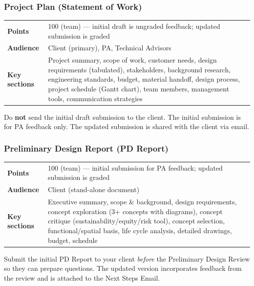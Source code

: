 \subsubsection{Project Plan (Statement of Work)}
\label{sssec:project-plan}

\begin{tabularx}{\textwidth}{lX}
\toprule
\textbf{Points} & 100 (team) --- initial draft is ungraded feedback; updated submission is graded \\
\textbf{Audience} & Client (primary), PA, Technical Advisors \\
\textbf{Key sections} & Project summary, scope of work, customer needs, design requirements (tabulated), stakeholders, background research, engineering standards, budget, material handoff, design process, project schedule (Gantt chart), team members, management tools, communication strategies \\
\bottomrule
\end{tabularx}

\begin{warnbox}
Do \textbf{not} send the initial draft submission to the client. The initial submission is for PA feedback only. The updated submission is shared with the client via email.
\end{warnbox}

\subsubsection{Preliminary Design Report (PD Report)}
\label{sssec:pdr-report}

\begin{tabularx}{\textwidth}{lX}
\toprule
\textbf{Points} & 100 (team) --- initial submission for PA feedback; updated submission is graded \\
\textbf{Audience} & Client (stand-alone document) \\
\textbf{Key sections} & Executive summary, scope \& background, design requirements, concept exploration (3+ concepts with diagrams), concept critique (sustainability/equity/risk tool), concept selection, functional/spatial basis, life cycle analysis, detailed drawings, budget, schedule \\
\bottomrule
\end{tabularx}

\begin{protip}
Submit the initial PD Report to your client \emph{before} the Preliminary Design Review so they can prepare questions. The updated version incorporates feedback from the review and is attached to the Next Steps Email.
\end{protip}

